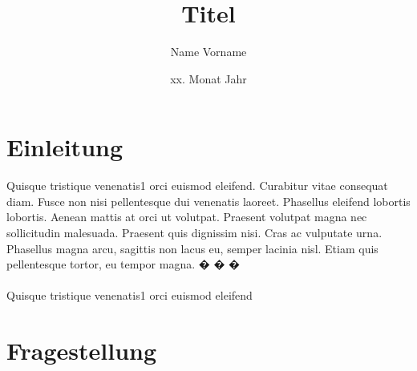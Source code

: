 \documentclass[
						a4paper,					%
						9.5pt,						%
	                    twocolumn				%
]{article}											%
\title{Titel} 										%
\author{Name Vorname} 				%
\date{xx. Monat Jahr} 					%
\begin{document}

\maketitle


\makeatletter
\patchcmd{\@fancyhead}{\rlap}{\color{bfhgrey}\rlap}{}{}			%
\patchcmd{\@fancyfoot}{\rlap}{\color{bfhgrey}\rlap}{}{}			%
\makeatother

\fancyhf{}														 	 							%

\renewcommand{\headrulewidth}{0.5pt}										%
\renewcommand{\footrulewidth}{0.5pt} 									 	%

\pagestyle{plain}																			%


			

\section{Einleitung}

Quisque tristique venenatis1 orci euismod eleifend. Curabitur vitae consequat diam. Fusce non nisi pellentesque dui venenatis laoreet. Phasellus eleifend lobortis lobortis. Aenean mattis at orci ut volutpat. Praesent volutpat magna nec sollicitudin malesuada. Praesent quis dignissim nisi. Cras ac vulputate urna. Phasellus magna arcu, sagittis non lacus eu, semper lacinia nisl. Etiam quis pellentesque tortor, eu tempor magna. � � � \\
\\
Quisque tristique venenatis1 orci euismod eleifend \autocite[S. 5]{baurSaechtlingKunststoffTaschenbuch2013}

\section{Fragestellung}
\end{document}
